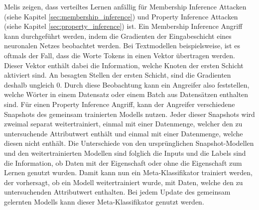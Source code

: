 Melis \etal \cite{P-82} zeigen, dass verteiltes Lernen anfällig für Membership Inference Attacken (siehe Kapitel \ref{sec:membership_inference}) und Property Inference Attacken (siehe Kapitel \ref{sec:property_inference}) ist.
Ein Membership Inference Angriff kann durchgeführt werden, indem die Gradienten der Eingabeschicht eines neuronalen Netzes beobachtet werden. 
Bei Textmodellen beispielsweise, ist es oftmals der Fall, dass die Worte \bzw Tokens in einen Vektor übertragen werden. 
Dieser Vektor enthält dabei die Information, welche Knoten der ersten Schicht aktiviert sind. 
An besagten Stellen der ersten Schicht, sind die Gradienten deshalb ungleich 0.
Durch diese Beobachtung kann ein Angreifer also feststellen, welche Wörter in einem Datensatz oder einem Batch aus Datensätzen enthalten sind.
Für einen Property Inference Angriff, kann der Angreifer verschiedene Snapshots des gemeinsam trainierten Modells nutzen. 
Jeder dieser Snapshots wird zweimal separat weitertrainiert, einmal mit einer Datenmenge, welcher den zu untersuchende Attributwert enthält und einmal mit einer Datenmenge, welche diesen nicht enthält.
Die Unterschiede von den ursprünglichen Snapshot-Modellen und den weitertrainierten Modellen sind folglich die Inputs und die Labels sind die Information, ob Daten mit der Eigenschaft oder ohne die Eigenschaft zum Lernen genutzt wurden.
Damit kann nun ein Meta-Klassifikator trainiert werden, der vorhersagt, ob ein Modell weitertrainiert wurde, mit Daten, welche den zu untersuchenden Attributwert enthalten.
Bei jedem Update des gemeinsam gelernten Modells kann dieser Meta-Klassifikator genutzt werden.


